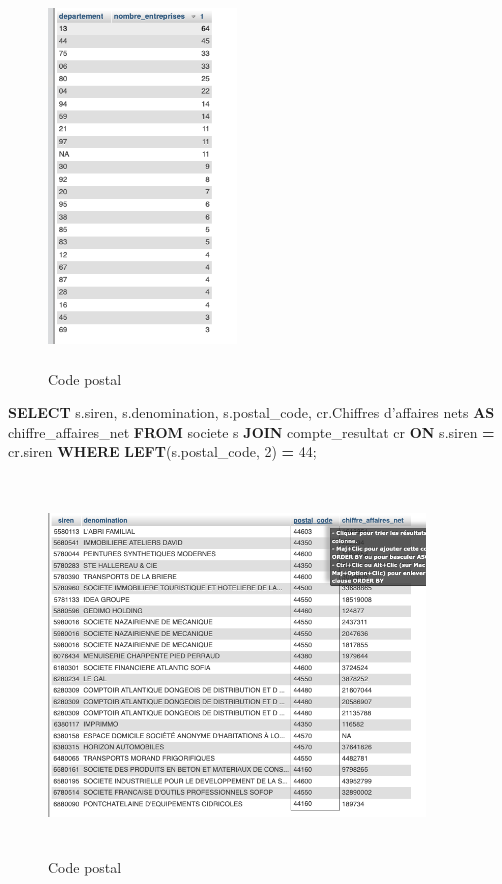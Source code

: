 \documentclass[mstat,12pt]{unswthesis}
\newenvironment{Shaded}{\begin{snugshade}}{\end{snugshade}}
\newcommand{\DecValTok}[1]{\textcolor[rgb]{0.00,0.00,0.81}{#1}}
\newcommand{\KeywordTok}[1]{\textcolor[rgb]{0.13,0.29,0.53}{\textbf{#1}}}
\newcommand{\NormalTok}[1]{#1}
\newcommand{\OperatorTok}[1]{\textcolor[rgb]{0.81,0.36,0.00}{\textbf{#1}}}
\newcommand{\StringTok}[1]{\textcolor[rgb]{0.31,0.60,0.02}{#1}}
\begin{document}
\begin{figure}
\centering
\includegraphics[width=5cm,height=10cm]{image_sql/sql_1_Serdar.png}
\caption{Code postal}
\end{figure}

\newpage

\begin{Shaded}
\begin{Highlighting}[]
\KeywordTok{SELECT} 
\NormalTok{    s.siren,}
\NormalTok{    s.denomination,}
\NormalTok{    s.postal\_code,}
\NormalTok{    cr.\textasciigrave{}Chiffres d’affaires nets\textasciigrave{} }\KeywordTok{AS}\NormalTok{ chiffre\_affaires\_net}
\KeywordTok{FROM} 
\NormalTok{    societe s}
\KeywordTok{JOIN} 
\NormalTok{    compte\_resultat cr }\KeywordTok{ON}\NormalTok{ s.siren }\OperatorTok{=}\NormalTok{ cr.siren}
\KeywordTok{WHERE} 
    \KeywordTok{LEFT}\NormalTok{(s.postal\_code, }\DecValTok{2}\NormalTok{) }\OperatorTok{=} \StringTok{\textquotesingle{}44\textquotesingle{}}\NormalTok{;}
\end{Highlighting}
\end{Shaded}

\begin{figure}
\centering
\includegraphics[width=10cm,height=10cm]{image_sql/sql_2_serdar.png}
\caption{Code postal}
\end{figure}
\end{document}
